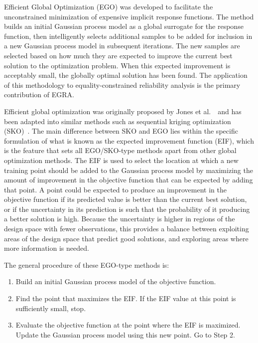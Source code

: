 Efficient Global Optimization (EGO) was developed to facilitate the 
unconstrained minimization of expensive implicit response functions.
The method builds an initial Gaussian process model as a global surrogate 
for the response function, then intelligently selects additional samples 
to be added for inclusion in a new Gaussian process model in subsequent 
iterations. The new samples are selected based on how much they are expected 
to improve the current best solution to the optimization problem.
When this expected improvement is acceptably small, the globally optimal 
solution has been found. The application of this methodology to 
equality-constrained reliability analysis is the primary contribution of 
EGRA.  

Efficient global optimization was originally proposed by
Jones et al.~\cite{Jon98}~and has been adapted into similar methods
such as sequential kriging optimization (SKO)~\cite{Hua06}.
The main difference between SKO and EGO lies within the specific formulation
of what is known as the expected improvement function (EIF), which is the
feature that sets all EGO/SKO-type methods apart from other global optimization
methods.
The EIF is used to select the location at which a new training point should be
added to the Gaussian process model by maximizing the amount of improvement in 
the objective function that can be expected by adding that point.
A point could be expected to produce an improvement in the objective function
if its predicted value is better than the current best solution, or if the
uncertainty in its prediction is such that the probability of it producing
a better solution is high.
Because the uncertainty is higher in regions of the design space with fewer
observations, this provides a balance between exploiting areas of the
design space that predict good solutions, and exploring areas where more
information is needed.

The general procedure of these EGO-type methods is:
\begin{enumerate}
\item Build an initial Gaussian process model of the objective function.
\item Find the point that maximizes the EIF.
      If the EIF value at this point is sufficiently small, stop.
\item Evaluate the objective function at the point where the EIF is maximized.
      Update the Gaussian process model using this new point.
      Go to Step 2.
\end{enumerate}
\noindent 

